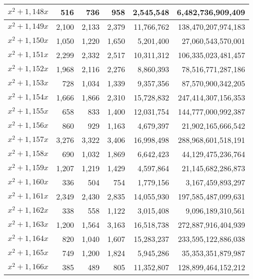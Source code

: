 \documentclass[a4paper]{amsproc}
\theoremstyle{plain}
\theoremstyle{named}
\begin{document}
\begin{longtable}{ | l | r | r | r | r | r | }
$x^2 + 1{,}148x$ & 516 & 736 & 958 & 2{,}545{,}548 & 6{,}482{,}736{,}909{,}409 \\ \hline
$x^2 + 1{,}149x$ & 2{,}100 & 2{,}133 & 2{,}379 & 11{,}766{,}762 & 138{,}470{,}207{,}974{,}183 \\ \hline
$x^2 + 1{,}150x$ & 1{,}050 & 1{,}220 & 1{,}650 & 5{,}201{,}400 & 27{,}060{,}543{,}570{,}001 \\ \hline
$x^2 + 1{,}151x$ & 2{,}299 & 2{,}332 & 2{,}517 & 10{,}311{,}312 & 106{,}335{,}023{,}481{,}457 \\ \hline
$x^2 + 1{,}152x$ & 1{,}968 & 2{,}116 & 2{,}276 & 8{,}860{,}393 & 78{,}516{,}771{,}287{,}186 \\ \hline
$x^2 + 1{,}153x$ & 728 & 1{,}034 & 1{,}339 & 9{,}357{,}356 & 87{,}570{,}900{,}342{,}205 \\ \hline
$x^2 + 1{,}154x$ & 1{,}666 & 1{,}866 & 2{,}310 & 15{,}728{,}832 & 247{,}414{,}307{,}156{,}353 \\ \hline
$x^2 + 1{,}155x$ & 658 & 833 & 1{,}400 & 12{,}031{,}754 & 144{,}777{,}000{,}992{,}387 \\ \hline
$x^2 + 1{,}156x$ & 860 & 929 & 1{,}163 & 4{,}679{,}397 & 21{,}902{,}165{,}666{,}542 \\ \hline
$x^2 + 1{,}157x$ & 3{,}276 & 3{,}322 & 3{,}406 & 16{,}998{,}498 & 288{,}968{,}601{,}518{,}191 \\ \hline
$x^2 + 1{,}158x$ & 690 & 1{,}032 & 1{,}869 & 6{,}642{,}423 & 44{,}129{,}475{,}236{,}764 \\ \hline
$x^2 + 1{,}159x$ & 1{,}207 & 1{,}219 & 1{,}429 & 4{,}597{,}864 & 21{,}145{,}682{,}286{,}873 \\ \hline
$x^2 + 1{,}160x$ & 336 & 504 & 754 & 1{,}779{,}156 & 3{,}167{,}459{,}893{,}297 \\ \hline
$x^2 + 1{,}161x$ & 2{,}349 & 2{,}430 & 2{,}835 & 14{,}055{,}930 & 197{,}585{,}487{,}099{,}631 \\ \hline
$x^2 + 1{,}162x$ & 338 & 558 & 1{,}122 & 3{,}015{,}408 & 9{,}096{,}189{,}310{,}561 \\ \hline
$x^2 + 1{,}163x$ & 1{,}200 & 1{,}564 & 3{,}163 & 16{,}518{,}738 & 272{,}887{,}916{,}404{,}939 \\ \hline
$x^2 + 1{,}164x$ & 820 & 1{,}040 & 1{,}607 & 15{,}283{,}237 & 233{,}595{,}122{,}886{,}038 \\ \hline
$x^2 + 1{,}165x$ & 749 & 1{,}200 & 1{,}824 & 5{,}945{,}286 & 35{,}353{,}351{,}879{,}987 \\ \hline
$x^2 + 1{,}166x$ & 385 & 489 & 805 & 11{,}352{,}807 & 128{,}899{,}464{,}152{,}212 \\ \hline

\end{longtable}
\end{document}
